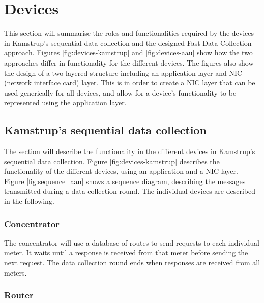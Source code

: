 \section{Devices}
\label{sec:devices}

This section will summarise the roles and functionalities required by the devices in Kamstrup's sequential data collection and the designed Fast Data Collection approach. Figures \ref{fig:devices-kamstrup} and \ref{fig:devices-aau} show how the two approaches differ in functionality for the different devices. The figures also show the design of a two-layered structure including an application layer and NIC (network interface card) layer. This is in order to create a NIC layer that can be used generically for all devices, and allow for a device's functionality to be represented using the application layer.

\subsection{Kamstrup's sequential data collection}

The section will describe the functionality in the different devices in Kamstrup's sequential data collection. Figure \ref{fig:devices-kamstrup} describes the functionality of the different devices, using an application and a NIC layer. Figure \ref{fig:sequence_aau} shows a sequence diagram, describing the messages transmitted during a data collection round. The individual devices are described in the following.



\subsubsection{Concentrator}

The concentrator will use a database of routes to send requests to each individual meter. It waits until a response is received from that meter before sending the next request. The data collection round ends when responses are received from all meters.
 
\subsubsection{Router}

